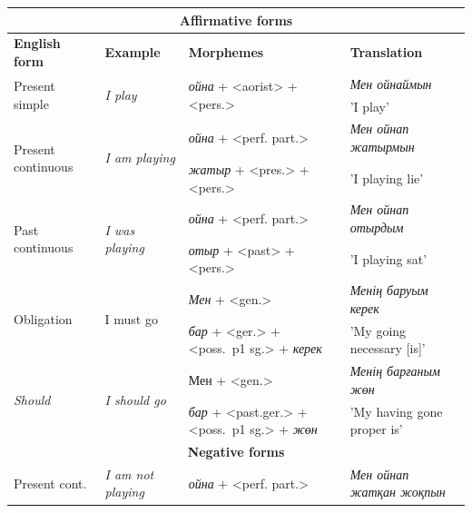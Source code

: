 \documentclass[11pt]{article}
\begin{document}
\begin{description}
\end{description}

\begin{table}
  \centering
  \begin{small}
  \begin{tabular}{|l|l|l|l|}
    \hline
    \multicolumn{4}{|c|}{\textbf{Affirmative forms}} \\
    \hline
    \textbf{English form} & \textbf{Example} & \textbf{Morphemes} & \textbf{Translation} \\
    \hline
    \multirow{2}{*}{Present simple} & \multirow{2}{*}{\emph{I play}} & \multirow{2}{*}{\emph{ойна} + <aorist> + <pers.>} & \emph{Мен ойнаймын} \\
                                    &                         &                                            & 'I play' \\
    \hline
    \multirow{2}{*}{Present continuous} & \multirow{2}{*}{\emph{I am playing}} & \emph{ойна} + <perf. part.>  & \emph{Мен ойнап жатырмын} \\
                                    &                         &   \emph{жатыр} + <pres.> + <pers.>     & 'I playing lie' \\
    \hline
    \multirow{2}{*}{Past continuous} & \multirow{2}{*}{\emph{I was playing}} & \emph{ойна} + <perf. part.>  & \emph{Мен ойнап отырдым} \\
                                    &                         & \emph{отыр} +  <past>  + <pers.>     & 'I playing sat' \\
    \hline
    \multirow{2}{*}{Obligation} & \multirow{2}{*}{I must go} & \emph{Мен}  + <gen.>  & \emph{Менің баруым керек} \\
                                    &                         & \emph{бар} + <ger.> +  <poss.\ p1 sg.> + \emph{керек}    & 'My going necessary [is]' \\
    \hline
    \multirow{2}{*}{\emph{Should}} & \multirow{2}{*}{\emph{I should go}} & Мен  + <gen.>  & \emph{Менің барғаным жөн} \\
                                    &                         & \emph{бар} + <past.ger.> +  <poss.\ p1 sg.> + \emph{жөн} & 'My having gone proper is' \\
    \hline
    \multicolumn{4}{|c|}{\textbf{Negative forms}} \\
    \hline
    \multirow{2}{*}{Present cont.} & \multirow{2}{*}{\emph{I am not playing}} & \emph{ойна} + <perf. part.>  & \emph{Мен ойнап жатқан жоқпын} \\

\end{tabular}
\end{small}
\end{table}
\end{document}
